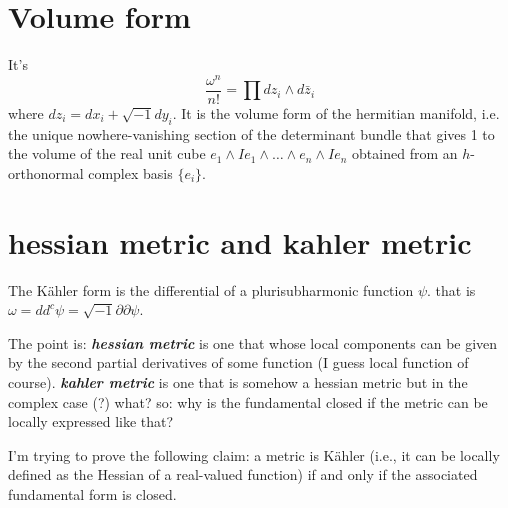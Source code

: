 \section{Volume form}
It's
\[\frac{\omega^n}{n!}=\prod dz_i \wedge d\bar{z}_i\]
where \(dz_i=dx_i + \sqrt{-1}dy_i\). It is the volume form of the hermitian manifold, i.e. the unique nowhere-vanishing section of the determinant bundle that gives 1 to the volume of the real unit cube \(e_1 \wedge Ie_1\wedge\ldots\wedge e_n \wedge I e_n\) obtained from an \(h\)-orthonormal complex basis \(\{e_i\}\).

\section{hessian metric and kahler metric}

The Kähler form is the differential of a plurisubharmonic function \(\psi\). that is \(\omega=d d^c \psi=\sqrt{-1} \partial \partial \psi\).

The point is: \textit{\textbf{hessian metric}} is one that whose local components can be given by the second partial derivatives of some function (I guess local function of course). \textit{\textbf{kahler metric}} is one that is somehow a hessian metric but in the complex case (?) what? so: why is the fundamental closed if the metric can be locally expressed like that?

\begin{exercise}\leavevmode
I’m trying to prove the following claim: a metric is Kähler (i.e., it can be locally defined as the Hessian of a real-valued function) if and only if the associated fundamental form is closed.
\end{exercise}

